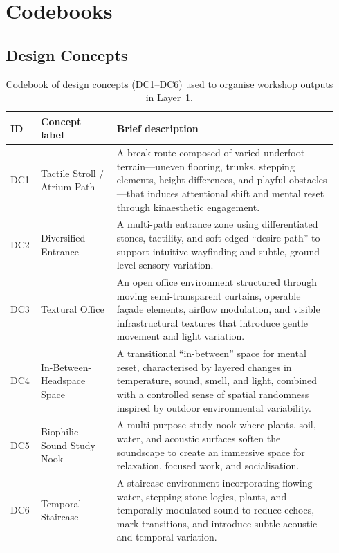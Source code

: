 \section{Codebooks}
\label{apx-sec-codebook}

\subsection{Design Concepts}
\label{apx-design-concepts}

\begin{table}[!ht]
\caption{Codebook of design concepts (DC1--DC6) used to organise workshop outputs in Layer~1.}
\label{tab:codebook-design-concepts}
\begin{tabular}{@{} p{0.08\linewidth} p{0.22\linewidth} p{0.64\linewidth} @{}}
\toprule
\textbf{ID} & \textbf{Concept label} & \textbf{Brief description} \\
\midrule
DC1 & Tactile Stroll / Atrium Path &
A break-route composed of varied underfoot terrain---uneven flooring, trunks, stepping elements, height differences, and playful obstacles---that induces attentional shift and mental reset through kinaesthetic engagement. \\
DC2 & Diversified Entrance &
A multi-path entrance zone using differentiated stones, tactility, and soft-edged ``desire path'' to support intuitive wayfinding and subtle, ground-level sensory variation. \\
DC3 & Textural Office &
An open office environment structured through moving semi-transparent curtains, operable façade elements, airflow modulation, and visible infrastructural textures that introduce gentle movement and light variation. \\
DC4 & In-Between-Headspace Space &
A transitional ``in-between'' space for mental reset, characterised by layered changes in temperature, sound, smell, and light, combined with a controlled sense of spatial randomness inspired by outdoor environmental variability. \\
DC5 & Biophilic Sound Study Nook &
A multi-purpose study nook where plants, soil, water, and  acoustic surfaces soften the soundscape to create an immersive space for relaxation, focused work, and socialisation. \\
DC6 & Temporal Staircase &
A staircase environment incorporating flowing water, stepping-stone logics, plants, and temporally modulated sound to reduce echoes, mark transitions, and introduce subtle acoustic and temporal variation. \\
\bottomrule
\end{tabular}
\end{table}


